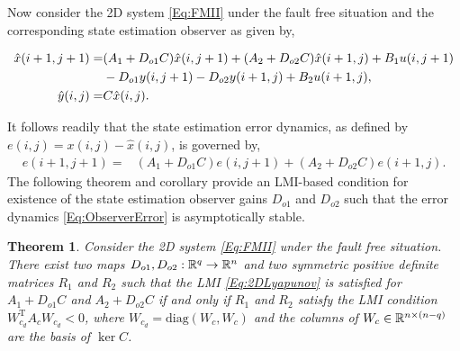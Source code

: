 \documentclass[journal,12pt,draftcls,onecolumn]{IEEEtran}
\newcommand{\tran}{\mathrm{T}}
\newcommand{\bs}{\begin{small}}
\newcommand{\es}{\end{small}}
\newcommand{\diag}{\mathrm{diag}}
\newtheorem{theorem}{Theorem}
\begin{document}
Now consider the 2D system \eqref{Eq:FMII} under the fault free situation and the corresponding  state estimation observer as given by,
\bs
\begin{align}\label{Eq:GeneralObserver}
	\hat{x}(i+1,j+1) = &(A_1+D_{o1}C)\hat{x}(i,j+1) + (A_2+D_{o2}C)\hat{x}(i+1,j) + B_1u(i,j+1)\notag\\ &-D_{o1}y(i,j+1)-D_{o2}y(i+1,j)+ B_2u(i+1,j),\notag\\
	\hat{y}(i,j) = &C\hat{x}(i,j).
\end{align}
\es
It follows readily that the state estimation error dynamics, as defined by $e(i,j)=x(i,j)-\hat{x}(i,j)$, is governed  by,
\begin{equation}\label{Eq:ObserverError}
	\begin{split}
		e(i+1,j+1) = &(A_1+D_{o1}C)e(i,j+1) + (A_2+D_{o2}C)e(i+1,j).
	\end{split}
\end{equation}
The following theorem and corollary provide an LMI-based condition for existence of the state estimation observer gains $D_{o1}$ and $D_{o2}$ such that the error dynamics \eqref{Eq:ObserverError} is asymptotically stable.
\begin{theorem}\label{Thm:ObserverGain2LMIs}
	Consider the 2D system \eqref{Eq:FMII} under the fault free situation.  There exist two maps $D_{o1},D_{o2}:\mathbb{R}^q\rightarrow\mathbb{R}^n$ and  two symmetric positive definite matrices $R_1$ and $R_2$ such that the LMI \eqref{Eq:2DLyapunov} is satisfied for $A_1+D_{o1}C$ and $A_2+D_{o2}C$ if and only if $R_1$ and $R_2$ satisfy the LMI condition $W_{c_d}^\tran A_c W_{c_d}<0$, where $W_{c_d}= \diag(W_c,W_c)$ and the columns of $W_c\in\mathbb{R}^{n\times(n-q)}$ are the basis of $\ker C$.
\end{theorem}
\end{document}
